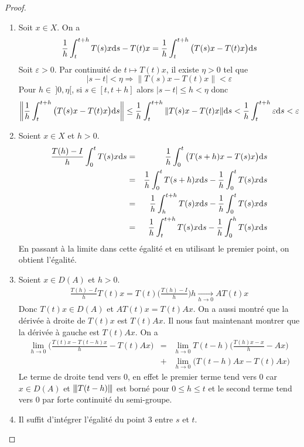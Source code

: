 \begin{proof}
    \begin{enumerate}
        \item Soit $x \in X$. On a 
        \begin{equation*}
            \frac{1}{h}\int_t^{t+h}T(s)x\mathrm{d} s -T(t)x = \frac{1}{h}\int_t^{t+h}\big(T(s)x-T(t)x\big)\mathrm{d} s
        \end{equation*}
        Soit $\varepsilon >0$. Par continuité de $t \mapsto T(t)x$, il existe $\eta >0$ tel que 
        \begin{equation*}
            |s-t| < \eta \Longrightarrow \|T(s)x-T(t)x\| < \varepsilon
        \end{equation*}
        Pour $h \in \ ]0,\eta [$, si $s \in [t,t+h]$ alors $|s-t| \leq h < \eta$ donc 
        \begin{eqnarray*}
            \bigg\|\frac{1}{h}\int_t^{t+h}\big(T(s)x-T(t)x\big)\mathrm{d} s \bigg\| \leq \frac{1}{h}\int_t^{t+h}\|T(s)x-T(t)x\|\mathrm{d} s < \frac{1}{h}\int_t^{t+h}\varepsilon \mathrm{d} s < \varepsilon
        \end{eqnarray*}
        \item Soient $x \in X$ et $h >0$.
        \begin{eqnarray*}
            \frac{T(h)-I}{h}\int_0^tT(s)x \mathrm{d} s&=& \frac{1}{h}\int_0^t\big(T(s+h)x-T(s)x\big)\mathrm{d} s \\
            &=& \frac{1}{h}\int_0^t T(s+h)x\mathrm{d} s - \frac{1}{h}\int_0^tT(s)x\mathrm{d} s \\
            &=& \frac{1}{h}\int_h^{t+h}T(s)x\mathrm{d} s - \frac{1}{h}\int_0^t T(s)x\mathrm{d} s \\
            &=& \frac{1}{h}\int_t^{t+h}T(s)x\mathrm{d} s - \frac{1}{h}\int_0^h T(s)x\mathrm{d} s
        \end{eqnarray*}
        En passant à la limite dans cette égalité et en utilisant le premier point, on obtient l'égalité.
        \item Soient $x \in D(A)$ et $h>0$.
        \begin{eqnarray*}
            \frac{T(h)-I}{h}T(t)x = T(t)\bigg(\frac{T(h)-I}{h}\bigg)h \underset{h \to 0}{\longrightarrow} AT(t)x
        \end{eqnarray*}
        Donc $T(t)x \in D(A)$ et $AT(t)x=T(t)Ax$. On a aussi montré que la dérivée à droite de $T(t)x$ est $T(t)Ax$. Il nous faut maintenant montrer que la dérivée à gauche est $T(t)Ax$. On a 
        \begin{eqnarray*}
            \lim_{h \to 0} \bigg(\frac{T(t)x-T(t-h)x}{h}-T(t)Ax\bigg) &=& \lim_{h \to 0} T(t-h)\bigg(\frac{T(h)x-x}{h}-Ax\bigg) \\
            &+& \lim_{h \to 0}\big(T(t-h)Ax-T(t)Ax\big)
        \end{eqnarray*}
        Le terme de droite tend vers $0$, en effet le premier terme tend vers $0$ car $x \in D(A)$ et ${\left\vert\kern-0.25ex\left\vert \kern-0.25ex\left\vert T(t-h) \right\vert\kern-0.25ex\right\vert\kern-0.25ex\right\vert}$ est borné pour $0\leq h \leq t$ et le second terme tend vers $0$ par forte continuité du semi-groupe.
        \item Il suffit d'intégrer l'égalité du point $3$ entre $s$ et $t$.
    \end{enumerate}
\end{proof}

